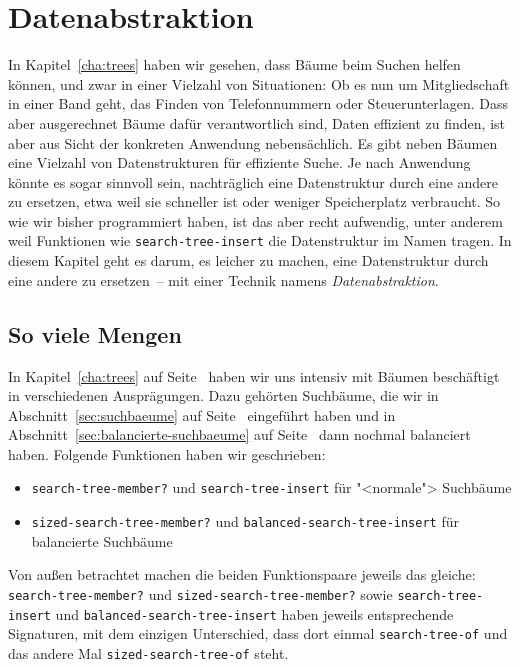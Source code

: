 
\chapter{Datenabstraktion}
\label{chap:datenabstraktion}


In Kapitel~\ref{cha:trees} haben wir gesehen, dass Bäume beim Suchen
helfen können, und zwar in einer Vielzahl von Situationen: Ob es nun
um Mitgliedschaft in einer Band geht, das Finden von Telefonnummern
oder Steuerunterlagen.  Dass aber ausgerechnet Bäume dafür
verantwortlich sind, Daten effizient zu finden, ist aber aus Sicht der
konkreten Anwendung nebensächlich.  Es gibt neben Bäumen eine Vielzahl
von Datenstrukturen für effiziente Suche.  Je nach Anwendung könnte es
sogar sinnvoll sein, nachträglich eine Datenstruktur durch eine andere
zu ersetzen, etwa weil sie schneller ist oder weniger Speicherplatz
verbraucht.  So wie wir bisher programmiert haben, ist das aber recht
aufwendig, unter anderem weil Funktionen wie
\lstinline{search-tree-insert} die Datenstruktur im Namen tragen.  In
diesem Kapitel geht es darum, es leicher zu machen, eine Datenstruktur
durch eine andere zu ersetzen~-- mit einer Technik namens
\textit{Datenabstraktion}.

\section{So viele Mengen}

In Kapitel~\ref{cha:trees} auf Seite~\pageref{cha:trees} haben wir uns
intensiv mit Bäumen beschäftigt in verschiedenen Ausprägungen.  Dazu
gehörten Suchbäume, die wir in Abschnitt~\ref{sec:suchbaeume} auf
Seite~\pageref{ref:sec:suchbaeume} eingeführt haben und in
Abschnitt~\ref{sec:balancierte-suchbaeume} auf
Seite~\pageref{sec:balancierte-suchbaeume} dann nochmal balanciert
haben.  Folgende Funktionen haben wir geschrieben:
%
\begin{itemize}
\item \lstinline{search-tree-member?} und
  \lstinline{search-tree-insert} für "<normale"> Suchbäume
\item \lstinline{sized-search-tree-member?} und
  \lstinline{balanced-search-tree-insert} für balancierte Suchbäume
\end{itemize}
%
Von außen betrachtet machen die beiden Funktionspaare jeweils das
gleiche: \lstinline{search-tree-member?} und
\lstinline{sized-search-tree-member?} sowie
\lstinline{search-tree-insert} und
\lstinline{balanced-search-tree-insert} haben jeweils entsprechende
Signaturen, mit dem einzigen Unterschied, dass dort einmal
\lstinline{search-tree-of} und das andere Mal
\lstinline{sized-search-tree-of} steht.

